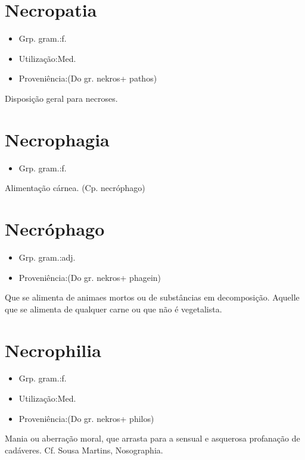 \section{Necropatia}
\begin{itemize}
\item {Grp. gram.:f.}
\end{itemize}
\begin{itemize}
\item {Utilização:Med.}
\end{itemize}
\begin{itemize}
\item {Proveniência:(Do gr. \textunderscore nekros\textunderscore  + \textunderscore pathos\textunderscore )}
\end{itemize}
Disposição geral para necroses.
\section{Necrophagia}
\begin{itemize}
\item {Grp. gram.:f.}
\end{itemize}
Alimentação cárnea.
(Cp. \textunderscore necróphago\textunderscore )
\section{Necróphago}
\begin{itemize}
\item {Grp. gram.:adj.}
\end{itemize}
\begin{itemize}
\item {Proveniência:(Do gr. \textunderscore nekros\textunderscore  + \textunderscore phagein\textunderscore )}
\end{itemize}
Que se alimenta de animaes mortos ou de substâncias em decomposição.
Aquelle que se alimenta de qualquer carne ou que não é vegetalista.
\section{Necrophilia}
\begin{itemize}
\item {Grp. gram.:f.}
\end{itemize}
\begin{itemize}
\item {Utilização:Med.}
\end{itemize}
\begin{itemize}
\item {Proveniência:(Do gr. \textunderscore nekros\textunderscore  + \textunderscore philos\textunderscore )}
\end{itemize}
Mania ou aberração moral, que arrasta para a sensual e asquerosa profanação de cadáveres. Cf. Sousa Martins, \textunderscore Nosographia\textunderscore .
